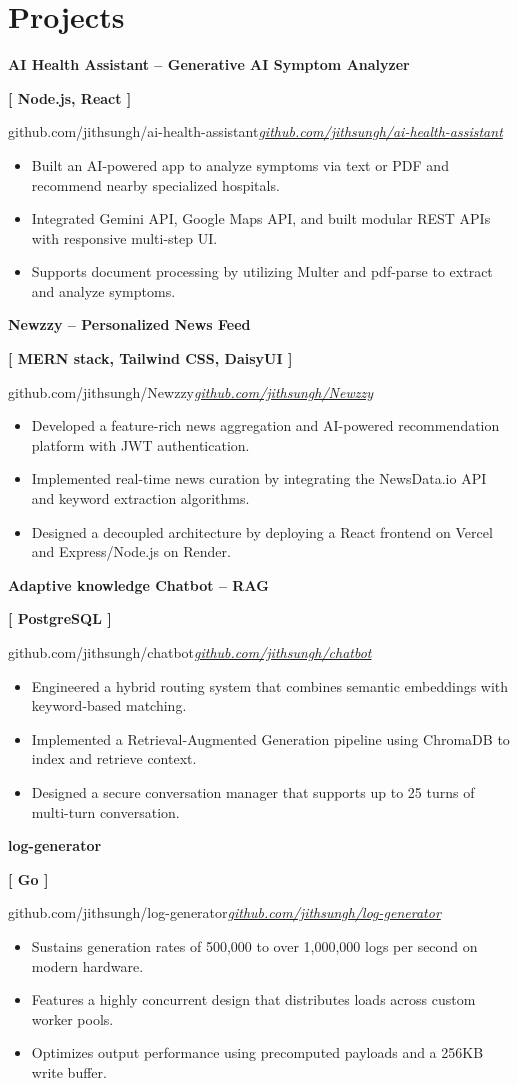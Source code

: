 \documentclass[a4paper,10pt]{article}
\newcommand{\tworow}[2]{%
  \noindent%
  \begin{minipage}[t]{0.615\textwidth}\raggedright #1\end{minipage}%
  \hfill%
  \begin{minipage}[t]{0.365\textwidth}\raggedleft #2\end{minipage}%
  \par%
}
\newcommand{\projentry}[4]{%
  \tworow{\textbf{#1}}{\textbf{\small[ #2 ]}}%
  \ifx\relax#3\relax\else\vspace{-0.15em}\textit{\small\href{#4}{#3}}\par\fi
}
\newenvironment{rbullets}{%
  \vspace{0.12em}%
  \begin{itemize}[leftmargin=1.1em, labelsep=0.4em, label=\textbullet,
                  itemsep=0.12em, topsep=0.08em, parsep=0pt, partopsep=0pt]%
}{%
  \end{itemize}%
}
\newcommand{\entrygap}{\vspace{0.55em}}
\begin{document}
\section*{Projects}
\projentry{AI Health Assistant -- Generative AI Symptom Analyzer}{Node.js, React}{github.com/jithsungh/ai-health-assistant}{https://github.com/jithsungh/ai-health-assistant}
\begin{rbullets}
  \item Built an AI-powered app to analyze symptoms via text or PDF and recommend nearby specialized hospitals.
  \item Integrated Gemini API, Google Maps API, and built modular REST APIs with responsive multi-step UI.
  \item Supports document processing by utilizing Multer and pdf-parse to extract and analyze symptoms.
\end{rbullets}
\entrygap
\projentry{Newzzy -- Personalized News Feed}{MERN stack, Tailwind CSS, DaisyUI}{github.com/jithsungh/Newzzy}{https://github.com/jithsungh/Newzzy}
\begin{rbullets}
  \item Developed a feature-rich news aggregation and AI-powered recommendation platform with JWT authentication.
  \item Implemented real-time news curation by integrating the NewsData.io API and keyword extraction algorithms.
  \item Designed a decoupled architecture by deploying a React frontend on Vercel and Express/Node.js on Render.
\end{rbullets}
\entrygap
\projentry{Adaptive knowledge Chatbot -- RAG}{PostgreSQL}{github.com/jithsungh/chatbot}{https://github.com/jithsungh/chatbot}
\begin{rbullets}
  \item Engineered a hybrid routing system that combines semantic embeddings with keyword-based matching.
  \item Implemented a Retrieval-Augmented Generation pipeline using ChromaDB to index and retrieve context.
  \item Designed a secure conversation manager that supports up to 25 turns of multi-turn conversation.
\end{rbullets}
\entrygap
\projentry{log-generator}{Go}{github.com/jithsungh/log-generator}{https://github.com/jithsungh/log-generator}
\begin{rbullets}
  \item Sustains generation rates of 500,000 to over 1,000,000 logs per second on modern hardware.
  \item Features a highly concurrent design that distributes loads across custom worker pools.
  \item Optimizes output performance using precomputed payloads and a 256KB write buffer.
\end{rbullets}
\end{document}
